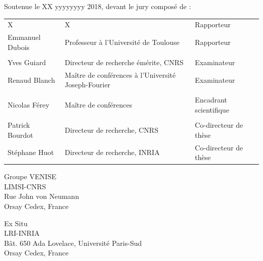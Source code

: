 \begin{titlepage}

Soutenue le XX yyyyyyyy 2018, devant le jury composé de :\\

\begin{center}
	\begin{tabular}{l l l}
	
	X					& X														& Rapporteur				\\ 
	Emmanuel Dubois		& Professeur à l'Université de Toulouse					& Rapporteur				\\
						& 														&							\\ %
	Yves Guiard			& Directeur de recherche émérite, CNRS					& Examinateur				\\ 				
	Renaud Blanch		& Maître de conférences à l'Université Joseph-Fourier	& Examinateur				\\ 
						& 														&							\\ %
	Nicolas Férey		& Maître de conférences									& Encadrant scientifique	\\
						& 														&							\\ %
	Patrick Bourdot 	& Directeur de recherche, CNRS							& Co-directeur de thèse		\\ 
	Stéphane Huot		& Directeur de recherche, INRIA							& Co-directeur de thèse		\\ 
		
	\end{tabular}
\end{center}


\setlength{\columnsep}{7mm}
\setlength{\columnseprule}{0pt}

\begin{multicols}{2} 
\small 
\noindent Groupe VENISE					\\	
\noindent LIMSI-CNRS					\\
\noindent Rue John von Neumann			\\
 Orsay Cedex, France		\\	

\columnbreak

\raggedleft Ex Situ										\\
\noindent LRI-INRIA										\\
\noindent Bât. 650 Ada Lovelace, Université Paris-Sud	\\
 Orsay Cedex, France
\end{multicols}



\end{titlepage}